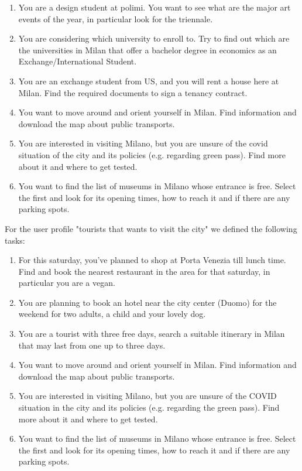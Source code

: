     \begin{enumerate}
        
        \item You are a design student at polimi. You want to see what are the major art events of the year, in particular look for the triennale.
        \item You are considering which university to enroll to. Try to find out which are the universities in Milan that offer a bachelor degree in economics as an Exchange/International Student.
        \item You are an exchange student from US, and you will rent a house here at Milan. Find the required documents to sign a tenancy contract.
        \item You want to move around and orient yourself in Milan. Find information and download the map about public transports.
        \item You are interested in visiting Milano, but you are unsure of the covid situation of the city and its policies (e.g. regarding green pass). Find more about it and where to get tested.
        \item You want to find the list of museums in Milano whose entrance is free. Select the first and look for its opening times, how to reach it and if there are any parking spots. 
    \end{enumerate}
        For the user profile "tourists that wants to visit the city" we defined the following tasks:
    \begin{enumerate}
        \item For this saturday, you've planned to shop at Porta Venezia till lunch time. Find and book the nearest restaurant in the area for that saturday, in particular you are a vegan.
        \item You are planning to book an hotel near the city center (Duomo) for the weekend for two adults, a child and your lovely dog.
        \item You are a tourist with three free days, search a suitable itinerary in Milan that may last from one up to three days.
        \item You want to move around and orient yourself in Milan. Find information and download the map about public transports.
        \item You are interested in visiting Milano, but you are unsure of the COVID situation in the city and its policies (e.g. regarding the green pass). Find more about it and where to get tested.
        \item You want to find the list of museums in Milano whose entrance is free. Select the first and look for its opening times, how to reach it and if there are any parking spots.
    \end{enumerate}
    
